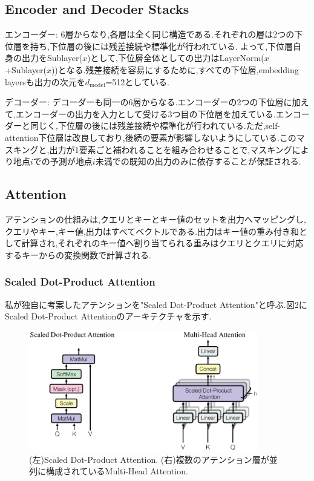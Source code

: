 \documentclass{jarticle}     %
\begin{document}
\subsection{Encoder and Decoder Stacks}
エンコーダー: 6層からなり,各層は全く同じ構造である.それぞれの層は2つの下位層を持ち,下位層の後には残差接続や標準化が行われている.
よって,下位層自身の出力をSublayer($x$)として,下位層全体としての出力はLayerNorm($x$+Sublayer($x$))となる.残差接続を容易にするために,すべての下位層,embedding layersも出力の次元を$d_\mathrm{model}$=512としている.\par
\par
デコーダー: デコーダーも同一の6層からなる.エンコーダーの2つの下位層に加えて,エンコーダーの出力を入力として受ける3つ目の下位層を加えている.エンコーダーと同じく,下位層の後には残差接続や標準化が行われている.ただ,self-attention下位層は改良しており,後続の要素が影響しないようにしている.このマスキングと,出力が1要素ごと補われることを組み合わせることで,マスキングにより地点$i$での予測が地点$i$未満での既知の出力のみに依存することが保証される.

\subsection{Attention}
アテンションの仕組みは,クエリとキーとキー値のセットを出力へマッピングし,クエリやキー,キー値,出力はすべてベクトルである.出力はキー値の重み付き和として計算され,それぞれのキー値へ割り当てられる重みはクエリとクエリに対応するキーからの変換関数で計算される.

\subsubsection{Scaled Dot-Product Attention}
私が独自に考案したアテンションを"Scaled Dot-Product Attention"と呼ぶ.図2にScaled Dot-Product Attentionのアーキテクチャを示す.\par

\begin{figure}[ht]
  \centering
  \includegraphics[width=100mm]{assets/Figure2.eps}

  \caption{(左)Scaled Dot-Product Attention. (右)複数のアテンション層が並列に構成されているMulti-Head Attention.}
  \label{Figure2}
\end{figure}
\end{document}
